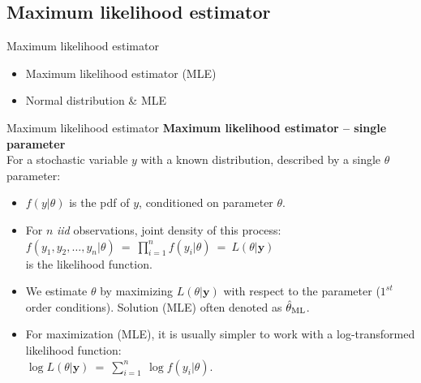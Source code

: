 \documentclass{beamer}
\begin{document}
\subsection{Maximum likelihood estimator}
\begin{frame}{Maximum likelihood estimator}
\begin{itemize}
    \item Maximum likelihood estimator (MLE)
    \bigskip
    \item Normal distribution \& MLE
\end{itemize}
\end{frame}
\begin{frame}{Maximum likelihood estimator}
\textbf{Maximum likelihood estimator -- single parameter}\\
\medskip
For a stochastic variable $y$ with a known distribution, described by a single $\theta$ parameter:\\
\medskip
\begin{itemize}
\item $f(y|\theta)$ is the pdf of $y$, conditioned on parameter $\theta$.
\medskip
\item For $n$ \textit{iid} observations, joint density of this process: \\
$f(y_1,y_2,\dots,y_n|\theta)~=~\displaystyle\prod_{i=1}^n f(y_i|\theta)~=~L(\theta|\bm{y})$ \\is the likelihood function.\\
\medskip
\item We estimate $\theta$ by maximizing $L(\theta|\bm{y})$ with respect to the parameter ($1^{st}$ order conditions). Solution (MLE) often denoted as $\hat{\theta}_{\textnormal{ML}}$.
\medskip
\item For maximization (MLE), it is usually simpler to work with a log-transformed likelihood function:\\
$\log L(\theta|\bm{y})~=~\displaystyle\sum_{i=1}^n ~ \log f(y_i|\theta)$.
\end{itemize}
\end{frame}
\end{document}
